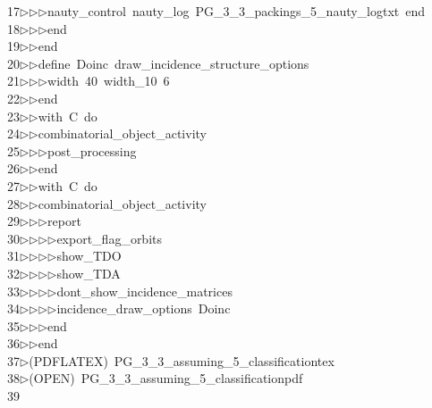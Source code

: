 \begin{tabbing}
17\>$\triangleright$\>$\triangleright$\>$\triangleright$\>nauty\_control\ nauty\_log\ PG\_3\_3\_packings\_5\_nauty\_logtxt\ end\ \\[0pt]
18\>$\triangleright$\>$\triangleright$\>$\triangleright$\>end\ \\[0pt]
19\>$\triangleright$\>$\triangleright$\>end\ \\[0pt]
20\>$\triangleright$\>$\triangleright$\>define\ Doinc\ draw\_incidence\_structure\_options\ \\[0pt]
21\>$\triangleright$\>$\triangleright$\>$\triangleright$\>width\ 40\ width\_10\ 6\ \\[0pt]
22\>$\triangleright$\>$\triangleright$\>end\ \\[0pt]
23\>$\triangleright$\>$\triangleright$\>with\ C\ do\ \\[0pt]
24\>$\triangleright$\>$\triangleright$\>combinatorial\_object\_activity\ \\[0pt]
25\>$\triangleright$\>$\triangleright$\>$\triangleright$\>post\_processing\ \\[0pt]
26\>$\triangleright$\>$\triangleright$\>end\ \\[0pt]
27\>$\triangleright$\>$\triangleright$\>with\ C\ do\ \\[0pt]
28\>$\triangleright$\>$\triangleright$\>combinatorial\_object\_activity\ \\[0pt]
29\>$\triangleright$\>$\triangleright$\>$\triangleright$\>report\ \\[0pt]
30\>$\triangleright$\>$\triangleright$\>$\triangleright$\>$\triangleright$\>export\_flag\_orbits\ \\[0pt]
31\>$\triangleright$\>$\triangleright$\>$\triangleright$\>$\triangleright$\>show\_TDO\ \\[0pt]
32\>$\triangleright$\>$\triangleright$\>$\triangleright$\>$\triangleright$\>show\_TDA\ \\[0pt]
33\>$\triangleright$\>$\triangleright$\>$\triangleright$\>$\triangleright$\>dont\_show\_incidence\_matrices\ \\[0pt]
34\>$\triangleright$\>$\triangleright$\>$\triangleright$\>$\triangleright$\>incidence\_draw\_options\ Doinc\ \\[0pt]
35\>$\triangleright$\>$\triangleright$\>$\triangleright$\>end\ \\[0pt]
36\>$\triangleright$\>$\triangleright$\>end\\[0pt]
37\>$\triangleright$\>(PDFLATEX)\ PG\_3\_3\_assuming\_5\_classificationtex\\[0pt]
38\>$\triangleright$\>(OPEN)\ PG\_3\_3\_assuming\_5\_classificationpdf\\[0pt]
39\>\end{tabbing}
